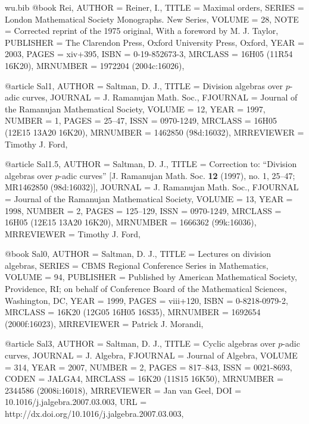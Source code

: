 \documentclass{amsart}
\numberwithin{equation}{section}
\theoremstyle{plain}
\theoremstyle{definition}
\begin{document}
\begin{filecontents}{wu.bib}
@book {Rei, 
    AUTHOR = {Reiner, I.},
     TITLE = {Maximal orders},
    SERIES = {London Mathematical Society Monographs. New Series},
    VOLUME = {28},
      NOTE = {Corrected reprint of the 1975 original,
              With a foreword by M. J. Taylor},
 PUBLISHER = {The Clarendon Press, Oxford University Press, Oxford},
      YEAR = {2003},
     PAGES = {xiv+395},
      ISBN = {0-19-852673-3},
   MRCLASS = {16H05 (11R54 16K20)},
  MRNUMBER = {1972204 (2004c:16026)},
}

@article {Sal1, 
    AUTHOR = {Saltman, D. J.},
     TITLE = {Division algebras over {$p$}-adic curves},
   JOURNAL = {J. Ramanujan Math. Soc.},
  FJOURNAL = {Journal of the Ramanujan Mathematical Society},
    VOLUME = {12},
      YEAR = {1997},
    NUMBER = {1},
     PAGES = {25--47},
      ISSN = {0970-1249},
   MRCLASS = {16H05 (12E15 13A20 16K20)},
  MRNUMBER = {1462850 (98d:16032)},
MRREVIEWER = {Timothy J. Ford},
}

@article {Sal1.5, 
    AUTHOR = {Saltman, D. J.},
     TITLE = {Correction to: ``{D}ivision algebras over {$p$}-adic curves''
              [{J}. {R}amanujan {M}ath. {S}oc. {\bf 12} (1997), no. 1,
              25--47; {MR}1462850 (98d:16032)]},
   JOURNAL = {J. Ramanujan Math. Soc.},
  FJOURNAL = {Journal of the Ramanujan Mathematical Society},
    VOLUME = {13},
      YEAR = {1998},
    NUMBER = {2},
     PAGES = {125--129},
      ISSN = {0970-1249},
   MRCLASS = {16H05 (12E15 13A20 16K20)},
  MRNUMBER = {1666362 (99k:16036)},
MRREVIEWER = {Timothy J. Ford},
}

@book {Sal0, 
    AUTHOR = {Saltman, D. J.},
     TITLE = {Lectures on division algebras},
    SERIES = {CBMS Regional Conference Series in Mathematics},
    VOLUME = {94},
 PUBLISHER = {Published by American Mathematical Society, Providence, RI; on
              behalf of Conference Board of the Mathematical Sciences,
              Washington, DC},
      YEAR = {1999},
     PAGES = {viii+120},
      ISBN = {0-8218-0979-2},
   MRCLASS = {16K20 (12G05 16H05 16S35)},
  MRNUMBER = {1692654 (2000f:16023)},
MRREVIEWER = {Patrick J. Morandi},
}

@article {Sal3, 
    AUTHOR = {Saltman, D. J.},
     TITLE = {Cyclic algebras over {$p$}-adic curves},
   JOURNAL = {J. Algebra},
  FJOURNAL = {Journal of Algebra},
    VOLUME = {314},
      YEAR = {2007},
    NUMBER = {2},
     PAGES = {817--843},
      ISSN = {0021-8693},
     CODEN = {JALGA4},
   MRCLASS = {16K20 (11S15 16K50)},
  MRNUMBER = {2344586 (2008i:16018)},
MRREVIEWER = {Jan van Geel},
       DOI = {10.1016/j.jalgebra.2007.03.003},
       URL = {http://dx.doi.org/10.1016/j.jalgebra.2007.03.003},
}


\end{filecontents}
\end{document}
